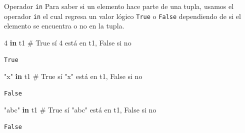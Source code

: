 \documentclass[
  ignorenonframetext,
  aspectratio=169,
  spanish,
]{beamer}
\newenvironment{Shaded}{\begin{snugshade}}{\end{snugshade}}
\newcommand{\CommentTok}[1]{\textcolor[rgb]{0.37,0.37,0.37}{#1}}
\newcommand{\DecValTok}[1]{\textcolor[rgb]{0.68,0.00,0.00}{#1}}
\newcommand{\KeywordTok}[1]{\textcolor[rgb]{0.00,0.23,0.31}{\textbf{#1}}}
\newcommand{\NormalTok}[1]{\textcolor[rgb]{0.00,0.23,0.31}{#1}}
\begin{document}
\begin{frame}[fragile]{Operador \texttt{in}}
\label{operador-in}
Para saber si un elemento hace parte de una tupla, usamos el operador
\texttt{in} el cual regresa un valor lógico \texttt{True} o
\texttt{False} dependiendo de si el elemento se encuentra o no en la
tupla.

\begin{Shaded}
\begin{Highlighting}[]
\DecValTok{4} \KeywordTok{in}\NormalTok{ t1     }\CommentTok{\# True sí 4 está en t1, False si no  }
\end{Highlighting}
\end{Shaded}

\begin{verbatim}
True
\end{verbatim}

\begin{Shaded}
\begin{Highlighting}[]
\CommentTok{"x"} \KeywordTok{in}\NormalTok{ t1   }\CommentTok{\# True sí  "x" está en t1,  False si no }
\end{Highlighting}
\end{Shaded}

\begin{verbatim}
False
\end{verbatim}

\begin{Shaded}
\begin{Highlighting}[]
\CommentTok{"abc"} \KeywordTok{in}\NormalTok{ t1 }\CommentTok{\# True sí "abc" está en t1,  False si no }
\end{Highlighting}
\end{Shaded}

\begin{verbatim}
False
\end{verbatim}
\end{frame}
\end{document}
